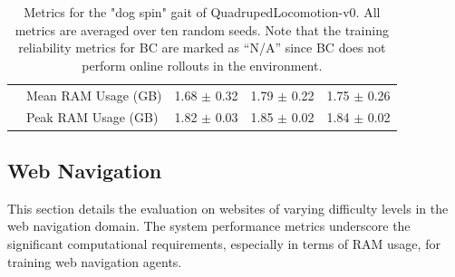 \begin{table}[!htbp]
{\begin{tabular}{|l|l|c|c|c|}
 & Mean RAM Usage (GB) & 1.68 $\pm$ 0.32 & 1.79 $\pm$ 0.22 & 1.75 $\pm$ 0.26 \\
 & Peak RAM Usage (GB) & 1.82 $\pm$ 0.03 & 1.85 $\pm$ 0.02 & 1.84 $\pm$ 0.02 \\
\bottomrule
\end{tabular}
}
\caption{Metrics for the "dog spin" gait of QuadrupedLocomotion-v0. All metrics are averaged over ten random seeds. Note that the training reliability metrics for BC are marked as ``N/A'' since BC does not perform online rollouts in the environment.}
\label{tab:appendix_locomotion_dog_spin}

\end{table}



\subsection{Web Navigation}
\label{appendix:web_navigation}

This section details the evaluation on websites of varying difficulty levels in the web navigation domain. The system performance metrics underscore the significant computational requirements, especially in terms of RAM usage, for training web navigation agents.

